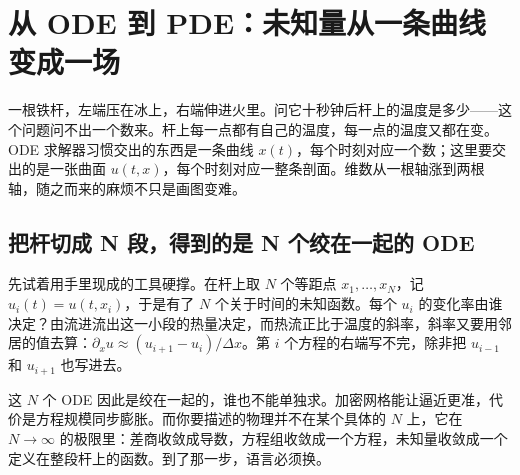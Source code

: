 \section{从 ODE 到 PDE：未知量从一条曲线变成一场}
\label{sec:15-Differential-Equations-and-Dynamical-Systems/03-PDE-Introduction/01}

一根铁杆，左端压在冰上，右端伸进火里。问它十秒钟后杆上的温度是多少——这个问题问不出一个数来。杆上每一点都有自己的温度，每一点的温度又都在变。ODE 求解器习惯交出的东西是一条曲线 \(x(t)\)，每个时刻对应一个数；这里要交出的是一张曲面 \(u(t,x)\)，每个时刻对应一整条剖面。维数从一根轴涨到两根轴，随之而来的麻烦不只是画图变难。

\subsection{把杆切成 N 段，得到的是 N 个绞在一起的 ODE}

先试着用手里现成的工具硬撑。在杆上取 \(N\) 个等距点 \(x_1,\dots,x_N\)，记 \(u_i(t)=u(t,x_i)\)，于是有了 \(N\) 个关于时间的未知函数。每个 \(u_i\) 的变化率由谁决定？由流进流出这一小段的热量决定，而热流正比于温度的斜率，斜率又要用邻居的值去算：\(\partial_x u\approx(u_{i+1}-u_i)/\Delta x\)。第 \(i\) 个方程的右端写不完，除非把 \(u_{i-1}\) 和 \(u_{i+1}\) 也写进去。

这 \(N\) 个 ODE 因此是绞在一起的，谁也不能单独求。加密网格能让逼近更准，代价是方程规模同步膨胀。而你要描述的物理并不在某个具体的 \(N\) 上，它在 \(N\to\infty\) 的极限里：差商收敛成导数，方程组收敛成一个方程，未知量收敛成一个定义在整段杆上的函数。到了那一步，语言必须换。

